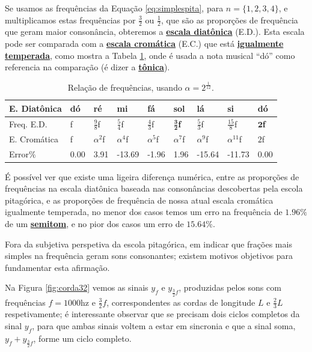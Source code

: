 Se usamos as frequências da Equação \ref{eq:simplespita}, para $n=\{1,2,3,4\}$,
e multiplicamos estas frequências por $\frac{3}{2}$ ou $\frac{1}{2}$, que
são as proporções de frequência que geram maior consonância,
obteremos a \hyperref[sec:pos:Diatonica]{\textbf{escala diatônica}} (E.D.).
Esta escala pode ser comparada com a \hyperref[sec:pos:Cromatica]{\textbf{escala cromática}} (E.C.)
que está \hyperref[subsec:tempigual]{\textbf{igualmente temperada}}, 
como mostra a Tabela \ref{tab:pitagorascromatica}, onde é usada a nota musical ``dó'' 
como referencia na comparação (é dizer a \hyperref[sec:Tonica]{\textbf{tônica}}).
\begin{table}[h]
  \centering
  \begin{tabular}{|l|l|l|l|l|l|l|l|l|}
  \hline
  E. Diatônica  & dó & ré & mi & fá & sol & lá & si & dó \\ \hline
  \hline
  Freq. E.D.  & f  & $\frac{9}{8}$f & $\frac{5}{4}$f & $\frac{4}{3}$f & $\mathbf{\frac{3}{2}}$\textbf{f} & $\frac{5}{3}$f & $\frac{15}{8}$f & $\mathbf{2}$\textbf{f}\\ \hline
  E. Cromática & f  & $\alpha^{2}$f  & $\alpha^{4}$f  & $\alpha^{5}$f  & $\alpha^{7}$f  & $\alpha^{9}$f  & $\alpha^{11}$f  & $2$f\\ \hline \hline
  Error$\%$ &  0.00 & 3.91 &-13.69 &-1.96 & 1.96 &-15.64&-11.73& 0.00 \\ \hline
  \end{tabular}
  \caption{Relação de frequências, usando $\alpha=2^\frac{1}{12}$.}
  \label{tab:pitagorascromatica}
\end{table}

É possível ver que existe uma ligeira diferença numérica, 
entre as proporções de frequências na escala diatônica baseada nas consonâncias descobertas pela escola pitagórica,
e as proporções de frequência de nossa atual escala cromática igualmente temperada,
no menor dos casos temos um  erro na frequência de $1.96\%$ de um \hyperref[sec:pos:Semitom]{\textbf{semitom}}, 
e no pior dos casos um erro de $15.64\%$.

Fora da subjetiva perspetiva da escola pitagórica, 
em indicar que frações mais simples na frequência geram sons consonantes; 
existem motivos objetivos para fundamentar esta afirmação.

Na Figura \ref{fig:corda32} vemos as sinais $y_{f}$ e $y_{\frac{3}{2}f}$, 
produzidas pelos sons com frequências $f=1000$hz e $\frac{3}{2}f$,
correspondentes as cordas de longitude $L$ e $\frac{2}{3}L$ respetivamente;
é interessante observar que se precisam dois ciclos completos da sinal $y_{f}$,
para que ambas sinais voltem a estar em sincronia e que a sinal soma, $y_{f}+y_{\frac{3}{2}f}$, forme um ciclo completo.


